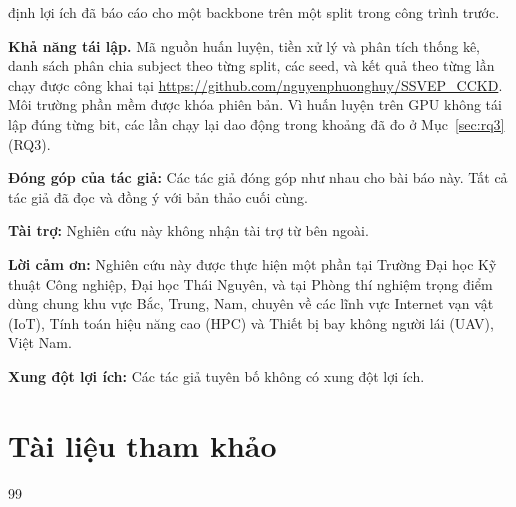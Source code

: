 \documentclass[11pt,a4paper,twoside,asymmetric]{article}
\begin{document}
định lợi ích đã báo cáo cho một backbone trên một split trong công trình trước.

\begin{sloppypar}
\noindent \textbf{Khả năng tái lập.} Mã nguồn huấn luyện, tiền xử lý và phân tích thống kê, danh sách phân chia subject theo từng split, các seed, và kết quả theo từng lần chạy được công khai tại \url{https://github.com/nguyenphuonghuy/SSVEP_CCKD}. Môi trường phần mềm được khóa phiên bản. Vì huấn luyện trên GPU không tái lập đúng từng bit, các lần chạy lại dao động trong khoảng đã đo ở Mục~\ref{sec:rq3} (RQ3).
\end{sloppypar}

\noindent \textbf{Đóng góp của tác giả:} Các tác giả đóng góp như nhau cho bài báo này. Tất cả tác giả đã đọc và đồng ý với bản thảo cuối cùng.

\noindent \textbf{Tài trợ:} Nghiên cứu này không nhận tài trợ từ bên ngoài.

\noindent \textbf{Lời cảm ơn:} Nghiên cứu này được thực hiện một phần tại Trường Đại học Kỹ thuật Công nghiệp, Đại học Thái Nguyên, và tại Phòng thí nghiệm trọng điểm dùng chung khu vực Bắc, Trung, Nam, chuyên về các lĩnh vực Internet vạn vật (IoT), Tính toán hiệu năng cao (HPC) và Thiết bị bay không người lái (UAV), Việt Nam.

\noindent \textbf{Xung đột lợi ích:} Các tác giả tuyên bố không có xung đột lợi ích.

\section*{Tài liệu tham khảo}
\small{
\begin{thebibliography}{99}
\itemsep 0pt

\end{thebibliography}
}
\end{document}
